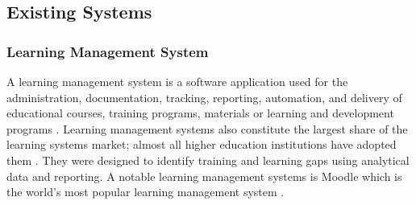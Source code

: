\subsection{Existing Systems}

\subsubsection{Learning Management System }
A learning management system is a software application used for the administration, documentation, tracking, reporting, automation, and delivery of educational courses, training programs, materials or learning and development programs \cite{wikipediacontributors_2019_learning_management_systems}. Learning management systems also constitute the largest share of the learning systems market; almost all higher education institutions have adopted them \cite{wikipediacontributors_2019_learning_management_systems}. They were designed to identify training and learning gaps using analytical data and reporting. A notable learning management systems is Moodle which is the world's most popular learning management system \cite{wikipediacontributors_2019_learning_management_systems}.

